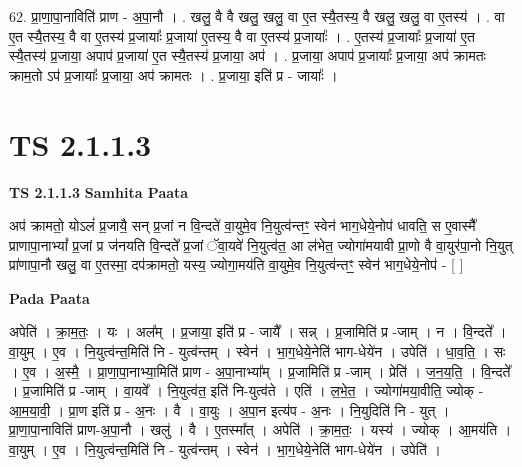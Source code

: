 \documentclass[17pt]{extarticle}
\begin{document}
62. प्रा॒णा॒पा॒नाविति॑ प्राण - अ॒पा॒नौ । . खलु॒ वै वै खलु॒ खलु॒ वा ए॒त स्यै॒तस्य॒ वै खलु॒ खलु॒ वा ए॒तस्य॑ । . वा ए॒त स्यै॒तस्य॒ वै वा ए॒तस्य॑ प्र॒जायाः᳚ प्र॒जाया॑ ए॒तस्य॒ वै वा ए॒तस्य॑ प्र॒जायाः᳚ । . ए॒तस्य॑ प्र॒जायाः᳚ प्र॒जाया॑ ए॒त स्यै॒तस्य॑ प्र॒जाया॒ अपाप॑ प्र॒जाया॑ ए॒त स्यै॒तस्य॑ प्र॒जाया॒ अप॑ । . प्र॒जाया॒ अपाप॑ प्र॒जायाः᳚ प्र॒जाया॒ अप॑ क्रामतः क्राम॒तो ऽप॑ प्र॒जायाः᳚ प्र॒जाया॒ अप॑ क्रामतः । . प्र॒जाया॒ इति॑ प्र - जायाः᳚ । \newline
\pagebreak
{}
\section*{ TS 2.1.1.3 }

\textbf{TS 2.1.1.3 } \newline
\textbf{Samhita Paata} \newline

अप॑ क्रामतो॒ योऽलं॑ प्र॒जायै॒ सन् प्र॒जां न वि॒न्दते॑ वा॒युमे॒व नि॒युत्व॑न्तꣳ॒॒  स्वेन॑ भाग॒धेये॒नोप॑ धावति॒ स ए॒वास्मै᳚ प्राणापा॒नाभ्यां᳚ प्र॒जां प्र ज॑नयति वि॒न्दते᳚ प्र॒जां ॅवा॒यवे॑ नि॒युत्व॑त॒ आ ल॑भेत॒ ज्योगा॑मयावी प्रा॒णो वै वा॒युर॑पा॒नो नि॒युत् प्रा॑णापा॒नौ खलु॒ वा ए॒तस्मा॒ दप॑क्रामतो॒ यस्य॒ ज्योगा॒मय॑ति वा॒युमे॒व नि॒युत्व॑न्तꣳ॒॒ स्वेन॑ भाग॒धेये॒नोप॑ - [  ] \newline

\textbf{Pada Paata} \newline

अपेति॑ । क्रा॒म॒तः॒ । यः । अल᳚म् । प्र॒जाया॒ इति॑ प्र - जायै᳚ । सन्न् । प्र॒जामिति॑ प्र -जाम् । न । वि॒न्दते᳚ । वा॒युम् । ए॒व । नि॒युत्व॑न्त॒मिति॑ नि - युत्व॑न्तम् । स्वेन॑ । भा॒ग॒धेये॒नेति॑ भाग-धेये॑न । उपेति॑ । धा॒व॒ति॒ । सः । ए॒व । अ॒स्मै॒ । प्रा॒णा॒पा॒नाभ्या॒मिति॑ प्राण - अ॒पा॒नाभ्या᳚म् । प्र॒जामिति॑ प्र -जाम् । प्रेति॑ । ज॒न॒य॒ति॒ । वि॒न्दते᳚ । प्र॒जामिति॑ प्र -जाम् । वा॒यवे᳚ । नि॒युत्व॑त॒ इति॑ नि-युत्व॑ते । एति॑ । ल॒भे॒त॒ । ज्योगा॑मया॒वीति॒ ज्योक् - आ॒म॒या॒वी॒ । प्रा॒ण इति॑ प्र - अ॒नः । वै । वा॒युः । अ॒पा॒न इत्य॑प - अ॒नः । नि॒युदिति॑ नि - युत् । प्रा॒णा॒पा॒नाविति॑ प्राण-अ॒पा॒नौ । खलु॑ । वै । ए॒तस्मा᳚त् । अपेति॑ । क्रा॒म॒तः॒ । यस्य॑ । ज्योक् । आ॒मय॑ति । वा॒युम् । ए॒व । नि॒युत्व॑न्त॒मिति॑ नि - युत्व॑न्तम् । स्वेन॑ । भा॒ग॒धेये॒नेति॑ भाग-धेये॑न । उपेति॑ ।  \newline
\end{document}
